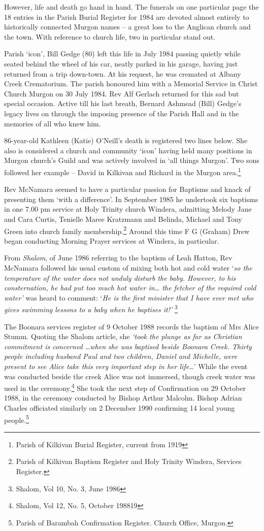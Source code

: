 However, life and death go hand in hand. The funerals on one particular page the 18 entries in the Parish Burial Register for 1984 are devoted almost entirely to historically connected Murgon names -- a great loss to the Anglican church and the town. With reference to church life, two in particular stand out.

Parish `icon', Bill Gedge (80) left this life in July 1984 passing quietly while seated behind the wheel of his car, neatly parked in his garage, having just returned from a trip down-town. At his request, he was cremated at Albany Creek Crematorium. The parish honoured him with a Memorial Service in Christ Church Murgon on 30 July 1984. Rev Alf Gerlach returned for this sad but special occasion. Active till his last breath, Bernard Ashmead (Bill) Gedge's legacy lives on through the imposing presence of the Parish Hall and in the memories of all who knew him.

86-year-old Kathleen (Katie) O'Neill's death is registered two lines below. She also is considered a church and community `icon' having held many positions in Murgon church's Guild and was actively involved in `all things Murgon'. Two sons followed her example -- David in Kilkivan and Richard in the Murgon area.\footnote{Parish of Kilkivan Burial Register, current from 1919}

Rev McNamara seemed to have a particular passion for Baptisms and knack of presenting them `with a difference'. In September 1985 he undertook six baptisms in one 7.00 pm service at Holy Trinity church Windera, admitting Melody Jane and Cara Curtis, Tenielle Maree Kratzmann and Belinda, Michael and Tony Green into church family membership.\footnote{Parish of Kilkivan Baptism Register and Holy Trinity Windera, Services Register.} Around this time F G (Graham) Drew began conducting Morning Prayer services at Windera, in particular.

From \emph{Shalom}, of June 1986 referring to the baptism of Leah Hatton, Rev McNamara followed his usual custom of mixing both hot and cold water `\emph{so the temperature of the water does not unduly disturb the baby. However, to his consternation, he had put too much hot water in\ldots{} the fetcher of the required cold water'} was heard to comment: `\emph{He is the first minister that I have ever met who gives swimming lessons to a baby when he baptises it!'} \footnote{Shalom, Vol 10, No. 3, June 1986}

The Boonara services register of 9 October 1988 records the baptism of Mrs Alice Stumm. Quoting the Shalom article, she \emph{`took the plunge as far as Christian commitment is concerned \ldots when she was baptised beside Boonara Creek. Thirty people including husband Paul and two children, Daniel and Michelle, were present to see Alice take this very important step in her life\ldots{}}' While the event was conducted beside the creek Alice was not immersed, though creek water was used in the ceremony.\footnote{Shalom, Vol 12, No. 5, October 198819} She took the next step of Confirmation on 29 October 1988, in the ceremony conducted by Bishop Arthur Malcolm. Bishop Adrian Charles officiated similarly on 2 December 1990 confirming 14 local young people.\footnote{Parish of Barambah Confirmation Register. Church Office, Murgon.}

